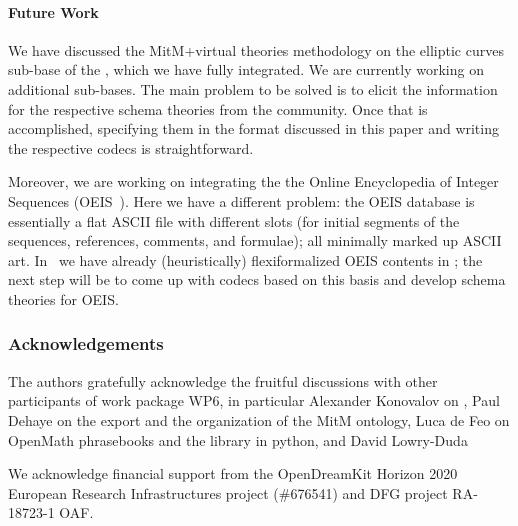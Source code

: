 \paragraph{Future Work}
We have discussed the MitM+virtual theories methodology on the elliptic curves sub-base of the \lmfdb, which we have fully integrated. 
We are currently working on additional \lmfdb sub-bases. 
The main problem to be solved is to elicit the information for the respective schema theories from the \lmfdb community. 
Once that is accomplished, specifying them in the format discussed in this paper and writing the respective codecs is straightforward. 

Moreover, we are working on integrating the the Online Encyclopedia of Integer Sequences (OEIS~\cite{Sloane:OEIS,oeis}). 
Here we have a different problem: the OEIS database is essentially a flat ASCII file with different slots (for initial segments of the sequences, references, comments, and formulae); all minimally marked up ASCII art. 
In~\cite{LuzKoh:fsarfo16} we have already (heuristically) flexiformalized OEIS contents in \ommt; the next step will be to come up with codecs based on this basis and develop schema theories for OEIS.


\subsubsection*{Acknowledgements}
The authors gratefully acknowledge the fruitful discussions with other participants of
work package WP6, in particular Alexander Konovalov on \SCSCP, Paul Dehaye on the \Sage
export and the organization of the MitM ontology, Luca de Feo on OpenMath phrasebooks
and the \SCSCP library in python, and David Lowry-Duda

We acknowledge financial support from the OpenDreamKit Horizon 2020 European Research
Infrastructures project (\#676541) and DFG project RA-18723-1 OAF.


